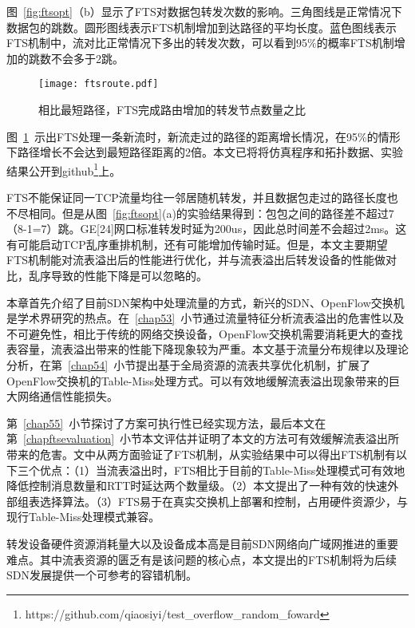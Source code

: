 图~\ref{fig:ftsopt}（b）显示了FTS对数据包转发次数的影响。三角图线是正常情况下数据包的跳数。圆形图线表示FTS机制增加到达路径的平均长度。蓝色图线表示FTS机制中，流对比正常情况下多出的转发次数，可以看到95\%的概率FTS机制增加的跳数不会多于2跳。

\begin{figure}[!ht]
	\centering 
	\vspace{-1.5mm} 
	\texttt{[image: ftsroute.pdf]}
	\caption{相比最短路径，FTS完成路由增加的转发节点数量之比} \label{fig:ftsroute}
\end{figure}

图~\ref{fig:ftsroute}~示出FTS处理一条新流时，新流走过的路径的距离增长情况，在95\%的情形下路径增长不会达到最短路径距离的2倍。本文已将将仿真程序和拓扑数据、实验结果公开到github\footnote{https://github.com/qiaosiyi/test\_overflow\_random\_foward}上。



FTS不能保证同一TCP流量均往一邻居随机转发，并且数据包走过的路径长度也不尽相同。但是从图~\ref{fig:ftsopt}(a)的实验结果得到：包包之间的路径差不超过7（8-1=7）跳。GE[24]网口标准转发时延为200us，因此总时间差不会超过2ms。这有可能启动TCP乱序重排机制，还有可能增加传输时延。但是，本文主要期望FTS机制能对流表溢出后的性能进行优化，并与流表溢出后转发设备的性能做对比，乱序导致的性能下降是可以忽略的。


本章首先介绍了目前SDN架构中处理流量的方式，新兴的SDN、OpenFlow交换机是学术界研究的热点。在~\ref{chap53}~小节通过流量特征分析流表溢出的危害性以及不可避免性，相比于传统的网络交换设备，OpenFlow交换机需要消耗更大的查找表容量，流表溢出带来的性能下降现象较为严重。本文基于流量分布规律以及理论分析，在第~\ref{chap54}~小节提出基于全局资源的流表共享优化机制，扩展了OpenFlow交换机的Table-Miss处理方式。可以有效地缓解流表溢出现象带来的巨大网络通信性能损失。

第~\ref{chap55}~小节探讨了方案可执行性已经实现方法，最后本文在第~\ref{chapftsevaluation}~小节本文评估并证明了本文的方法可有效缓解流表溢出所带来的危害。文中从两方面验证了FTS机制，从实验结果中可以得出FTS机制有以下三个优点：（1）当流表溢出时，FTS相比于目前的Table-Miss处理模式可有效地降低控制消息数量和RTT时延达两个数量级。（2）本文提出了一种有效的快速外部组表选择算法。（3）FTS易于在真实交换机上部署和控制，占用硬件资源少，与现行Table-Miss处理模式兼容。

转发设备硬件资源消耗量大以及设备成本高是目前SDN网络向广域网推进的重要难点。其中流表资源的匮乏有是该问题的核心点，本文提出的FTS机制将为后续SDN发展提供一个可参考的容错机制。






